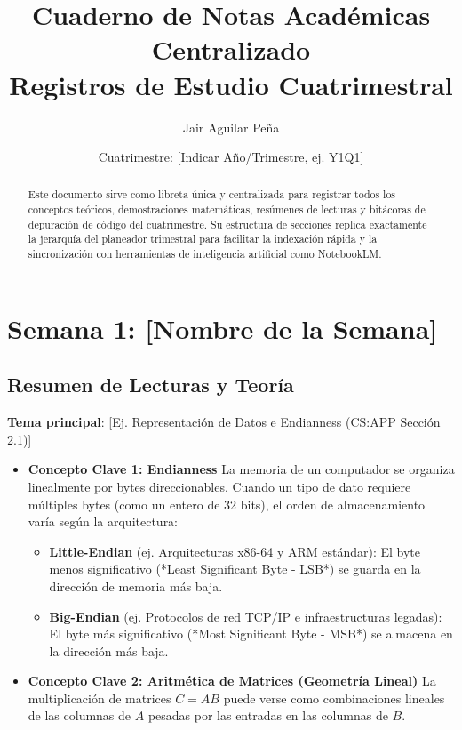 \documentclass[11pt, a4paper]{article}
\title{\textbf{\color{primary}Cuaderno de Notas Académicas Centralizado\\ \large Registros de Estudio Cuatrimestral}}
\author{Jair Aguilar Peña}
\date{Cuatrimestre: [Indicar Año/Trimestre, ej. Y1Q1]}
\begin{document}
\maketitle

\begin{abstract}
Este documento sirve como libreta única y centralizada para registrar todos los conceptos teóricos, demostraciones matemáticas, resúmenes de lecturas y bitácoras de depuración de código del cuatrimestre. Su estructura de secciones replica exactamente la jerarquía del planeador trimestral para facilitar la indexación rápida y la sincronización con herramientas de inteligencia artificial como NotebookLM.
\end{abstract}

\tableofcontents
\newpage

\section{Semana 1: [Nombre de la Semana]}

\subsection{Resumen de Lecturas y Teoría}
\textbf{Tema principal}: [Ej. Representación de Datos e Endianness (CS:APP Sección 2.1)]

\begin{itemize}
    \item \textbf{Concepto Clave 1: Endianness}
    La memoria de un computador se organiza linealmente por bytes direccionables. Cuando un tipo de dato requiere múltiples bytes (como un entero de 32 bits), el orden de almacenamiento varía según la arquitectura:
    \begin{itemize}
        \item \textbf{Little-Endian} (ej. Arquitecturas x86-64 y ARM estándar): El byte menos significativo (*Least Significant Byte - LSB*) se guarda en la dirección de memoria más baja.
        \item \textbf{Big-Endian} (ej. Protocolos de red TCP/IP e infraestructuras legadas): El byte más significativo (*Most Significant Byte - MSB*) se almacena en la dirección más baja.
    \end{itemize}
    
    \item \textbf{Concepto Clave 2: Aritmética de Matrices (Geometría Lineal)}
    La multiplicación de matrices $C = AB$ puede verse como combinaciones lineales de las columnas de $A$ pesadas por las entradas en las columnas de $B$.
\end{itemize}
\end{document}
